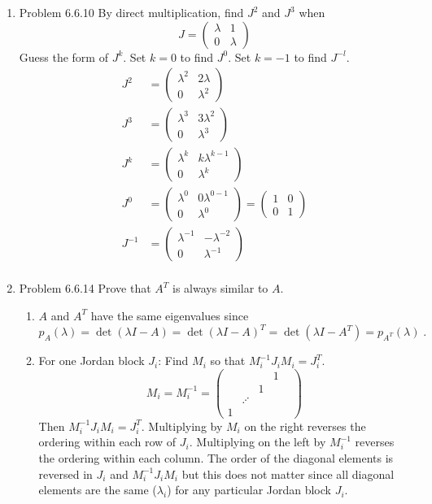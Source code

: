 \documentclass[a4paper]{article}
\begin{document}
\begin{enumerate}
\item{Problem 6.6.10} By direct multiplication, find $J^2$ and $J^3$ when
$$
J = \begin{pmatrix}
\lambda & 1 \\ 0 & \lambda
\end{pmatrix}
$$
Guess the form of $J^k$. Set $k = 0$ to find $J^0$. Set $k = -1$ to find $J^{-l}$.
\begin{align*}
J^2 &=
\begin{pmatrix}
\lambda^2 & 2\lambda \\ 0 & \lambda^2
\end{pmatrix} \\
J^3 &= \begin{pmatrix}
\lambda^3 & 3\lambda^2 \\ 0 & \lambda^3
\end{pmatrix} \\
J^k &= \begin{pmatrix}
\lambda^k & k\lambda^{k-1} \\ 0 & \lambda^k
\end{pmatrix} \\
J^0 &= \begin{pmatrix}
\lambda^0 & 0\lambda^{0-1} \\ 0 & \lambda^0
\end{pmatrix}
= \begin{pmatrix}
1 & 0 \\ 0 & 1
\end{pmatrix} \\
J^{-1} &= \begin{pmatrix}
\lambda^{-1} & -\lambda^{-2} \\ 0 & \lambda^{-1}
\end{pmatrix} \\
\end{align*} 

\item{Problem 6.6.14} Prove that $A^T$ is always similar to $A$.

\begin{enumerate}
	\item $A$ and $A^T$ have the same eigenvalues since
	$$
	p_A(\lambda) = \det(\lambda I - A) = \det (\lambda I - A)^T
	= \det (\lambda I - A^T) = p_{A^{T}}(\lambda) \;.
	$$
	
	\item For one Jordan block $J_i$: Find $M_i$ so that
	$M_i^{-1} J_i M_i = J_i^T$.  \\
	$$
	M_i = M_i^{-1} = \begin{pmatrix}
	& & & 1 \\ & & 1 & \\  & \iddots & & & \\ 1 & & & 
	\end{pmatrix}
	$$
	Then $M_i^{-1} J_i M_i = J_i^T$. Multiplying by $M_i$ on the
	right reverses the ordering within each row of $J_i$.
	Multiplying on the left by $M_i^{-1}$ reverses the ordering
	within each column. The order of the diagonal
	elements is reversed in $J_i$ and $M_i^{-1}J_i M_i$ but this
	does not matter since all diagonal elements are the same 
	($\lambda_i$) for any particular Jordan block $J_i$. 
	

\end{enumerate}
\end{enumerate}
\end{document}
